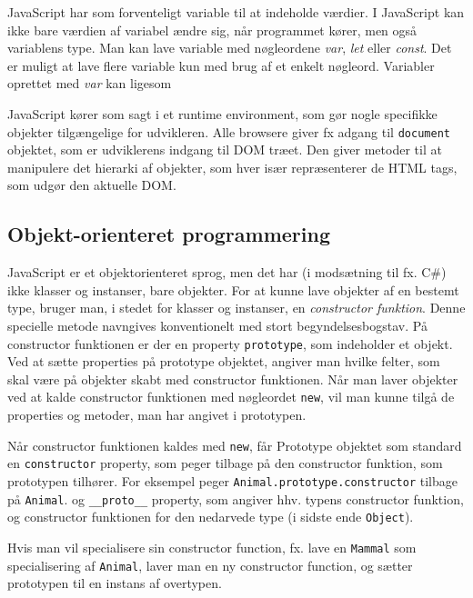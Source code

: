 \documentclass[]{article}
\begin{document}
JavaScript har som forventeligt variable til at indeholde værdier. I
JavaScript kan ikke bare værdien af variabel ændre sig, når programmet
kører, men også variablens type. Man kan lave variable med nøgleordene
\emph{var}, \emph{let} eller \emph{const}. Det er muligt at lave flere
variable kun med brug af et enkelt nøgleord. Variabler oprettet med
\emph{var} kan ligesom

JavaScript kører som sagt i et runtime environment, som gør nogle
specifikke objekter tilgængelige for udvikleren. Alle browsere giver fx
adgang til \texttt{document} objektet, som er udviklerens indgang til
DOM træet. Den giver metoder til at manipulere det hierarki af objekter,
som hver især repræsenterer de HTML tags, som udgør den aktuelle DOM.

\hypertarget{objekt-orienteret-programmering}{%
\subsection{Objekt-orienteret
programmering}\label{objekt-orienteret-programmering}}

JavaScript er et objektorienteret sprog, men det har (i modsætning til
fx. C\#) ikke klasser og instanser, bare objekter. For at kunne lave
objekter af en bestemt type, bruger man, i stedet for klasser og
instanser, en \emph{constructor funktion}. Denne specielle metode
navngives konventionelt med stort begyndelsesbogstav. På constructor
funktionen er der en property \texttt{prototype}, som indeholder et
objekt. Ved at sætte properties på prototype objektet, angiver man
hvilke felter, som skal være på objekter skabt med constructor
funktionen. Når man laver objekter ved at kalde constructor funktionen
med nøgleordet \texttt{new}, vil man kunne tilgå de properties og
metoder, man har angivet i prototypen.

Når constructor funktionen kaldes med \texttt{new}, får Prototype
objektet som standard en \texttt{constructor} property, som peger
tilbage på den constructor funktion, som prototypen tilhører. For
eksempel peger \texttt{Animal.prototype.constructor} tilbage på
\texttt{Animal}. og \texttt{\_\_proto\_\_} property, som angiver hhv.
typens constructor funktion, og constructor funktionen for den nedarvede
type (i sidste ende \texttt{Object}).

Hvis man vil specialisere sin constructor function, fx. lave en
\texttt{Mammal} som specialisering af \texttt{Animal}, laver man en ny
constructor function, og sætter prototypen til en instans af overtypen.
\end{document}

